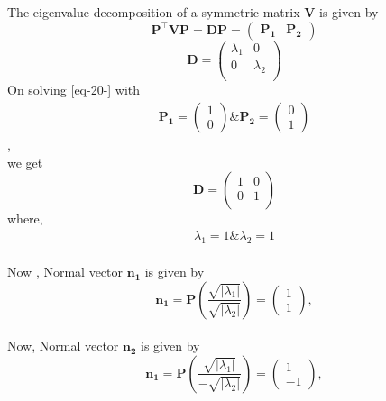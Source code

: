 \documentclass[journal,12pt,twocolumn]{IEEEtran}
\newcommand{\myvec}[1]{\ensuremath{\begin{pmatrix}#1\end{pmatrix}}}
\let\vec\mathbf
\let\vec\mathbf
\begin{document}
 The eigenvalue decomposition of a symmetric matrix $\vec{V}$ is given by
  \begin{equation}
  \vec{P}^{\top}\vec{V}\vec{P} = \vec{D} 
  \label{eq-20-} 
  \vec{P} = \myvec{\vec{P_1} & \vec{P_2}}                                                    
  \end{equation}
\begin{equation}
 \vec{D} = \begin{pmatrix}
          \lambda_1 & 0 \\
          0 & \lambda_2 \\
          \end{pmatrix}
  \end{equation}
  On solving \eqref{eq-20-} with 
  \begin{align} \vec{P_1} = \myvec{1 \\ 0} \&   \vec{P_2} = \myvec{0 \\ 1}
  \end{align},\\ we get
  \begin{equation}
 \vec{D} = \begin{pmatrix}
         1 & 0 \\                                                                              0 & 1 \\                                                                              
 \end{pmatrix}                                                                      
\end{equation}
where,
  \begin{align}
    \lambda_1 = 1  \&  \lambda_2 = 1
  \end{align}
\\
Now ,
 Normal vector  $\vec{n_1}$ is given by                                              \begin{equation}                                                                    
\vec{n_1} = \vec{P}(\frac{\sqrt{|\lambda_1|}}{\sqrt{|\lambda_2|}} ) = \myvec{1 \\1},
\end{equation}
\\
Now,
 Normal vector  $\vec{n_2}$ is given by                                              \begin{equation}                                                                    
\vec{n_1} = \vec{P}(\frac{\sqrt{|\lambda_1|}}{ - \sqrt{|\lambda_2|}} ) = \myvec{1 \\-1},
\end{equation}
\end{document}

